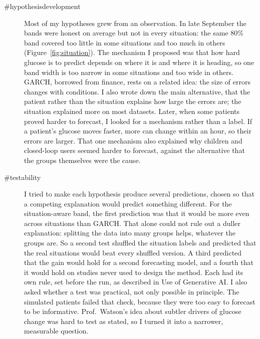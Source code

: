 \begin{description}
\item[\#hypothesisdevelopment] Most of my hypotheses grew from an observation. In late September the bands were honest on average but not in every situation: the same 80\% band covered too little in some situations and too much in others (Figure~\ref{fig:situation}). The mechanism I proposed was that how hard glucose is to predict depends on where it is and where it is heading, so one band width is too narrow in some situations and too wide in others. GARCH, borrowed from finance, rests on a related idea: the size of errors changes with conditions. I also wrote down the main alternative, that the patient rather than the situation explains how large the errors are; the situation explained more on most datasets. Later, when some patients proved harder to forecast, I looked for a mechanism rather than a label. If a patient's glucose moves faster, more can change within an hour, so their errors are larger. That one mechanism also explained why children and closed-loop users seemed harder to forecast, against the alternative that the groups themselves were the cause.
\item[\#testability] I tried to make each hypothesis produce several predictions, chosen so that a competing explanation would predict something different. For the situation-aware band, the first prediction was that it would be more even across situations than GARCH. That alone could not rule out a duller explanation: splitting the data into many groups helps, whatever the groups are. So a second test shuffled the situation labels and predicted that the real situations would beat every shuffled version. A third predicted that the gain would hold for a second forecasting model, and a fourth that it would hold on studies never used to design the method. Each had its own rule, set before the run, as described in Use of Generative AI. I also asked whether a test was practical, not only possible in principle. The simulated patients failed that check, because they were too easy to forecast to be informative. Prof.\ Watson's idea about subtler drivers of glucose change was hard to test as stated, so I turned it into a narrower, measurable question.

\end{description}
